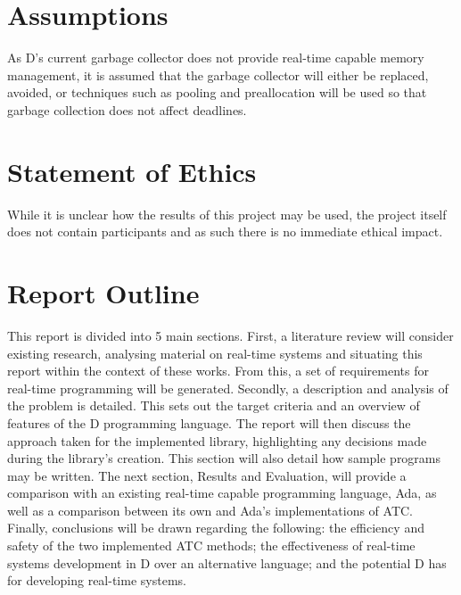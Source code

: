 \section{Assumptions} 
As D's current garbage collector does not provide real-time capable
memory management, it is assumed that the garbage collector will either be replaced, 
avoided, or techniques such as pooling and preallocation will be used so that 
garbage collection does not affect deadlines. 

\section{Statement of Ethics}
While it is unclear how the results of this project may be used, the project 
itself does not contain participants and as such there is no immediate ethical impact.

\section{Report Outline} %
This report is divided into 5 main sections.
First, a literature review will 
consider existing research, analysing material on 
real-time systems and situating this report within the context of these works. 
From this, a set of requirements for real-time programming will be generated. 
Secondly, a description and analysis of the problem is detailed. This sets out 
the target criteria and an overview of features of the D programming 
language. 
The report will then discuss the approach taken for the implemented library, 
highlighting any decisions made during the library's creation. This section will 
also detail how sample programs may be written.
The next section, Results and Evaluation, will provide a comparison with an 
existing real-time capable programming language, Ada, as well as a comparison 
between its own and Ada's implementations of ATC. 
Finally, conclusions will be drawn regarding the following: 
the efficiency and safety of the two implemented ATC methods;
the effectiveness of real-time systems development in D over an alternative
language;
and the potential D has for developing real-time systems.
